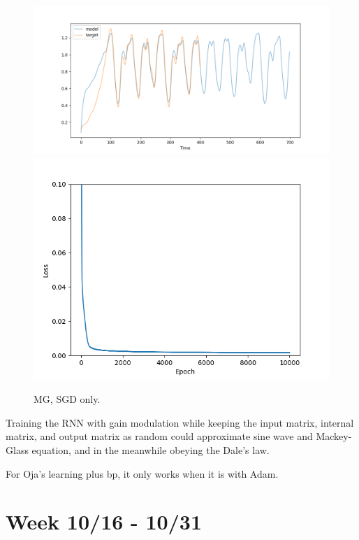\documentclass[12pt, a4paper]{article}
\begin{document}
\begin{figure}[H]
    \centering
    \includegraphics[width=\textwidth]{analysis/fig/1016_MG_bpgain_output.png}
    \includegraphics[width=\textwidth]{analysis/fig/1016_MG_bpgain_loss.png}
    \caption{MG, SGD only.}
\end{figure}

Training the RNN with gain modulation while keeping the input matrix, internal matrix, and output matrix as random could approximate sine wave and Mackey-Glass equation, and in the meanwhile obeying the Dale's law.

For Oja's learning plus bp, it only works when it is with Adam.

\newpage


\section*{Week 10/16 - 10/31}
\end{document}
